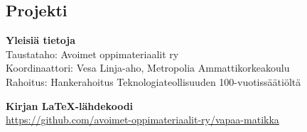 %



\newpage
\subsection*{Projekti}

\textbf{Yleisiä tietoja} \\
Taustataho: Avoimet oppimateriaalit ry \\
Koordinaattori: Vesa Linja-aho, Metropolia Ammattikorkeakoulu \\
Rahoitus: Hankerahoitus Teknologiateollisuuden 100-vuotissäätiöltä

\textbf{Kirjan LaTeX-lähdekoodi} \\
\url{https://github.com/avoimet-oppimateriaalit-ry/vapaa-matikka}

